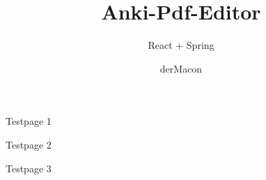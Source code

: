 \documentclass[xcolor=dvipanames]{beamer}
\title{Anki-Pdf-Editor}
\subtitle{React + Spring}
\author{derMacon}
\begin{document}
	\begin{frame}
		\titlepage
	\end{frame}
	
	\begin{frame}
		Testpage 1
	\end{frame}
	
	\begin{frame}
		Testpage 2
	\end{frame}
	
	\begin{frame}
		Testpage 3
	\end{frame}
\end{document}
